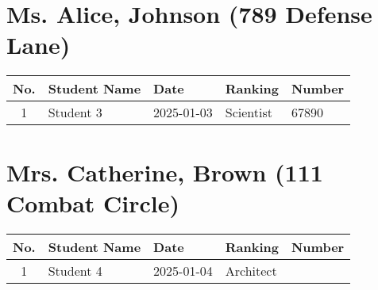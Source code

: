 \documentclass{book}
\begin{document}
\chapter*{Ms. Alice, Johnson (789 Defense Lane)}
\begin{tabularx}{\textwidth}{|c|X|X|X|X|}
\hline
\textbf{No.} & \textbf{Student Name} & \textbf{Date} & \textbf{Ranking} & \textbf{Number} \\
\hline
1 & Student 3 & 2025-01-03 & Scientist & 67890 \\
\hline
\end{tabularx}
\newpage
\chapter*{Mrs. Catherine, Brown (111 Combat Circle)}
\begin{tabularx}{\textwidth}{|c|X|X|X|X|}
\hline
\textbf{No.} & \textbf{Student Name} & \textbf{Date} & \textbf{Ranking} & \textbf{Number} \\
\hline
1 & Student 4 & 2025-01-04 & Architect &  \\
\hline
\end{tabularx}
\newpage
\end{document}
